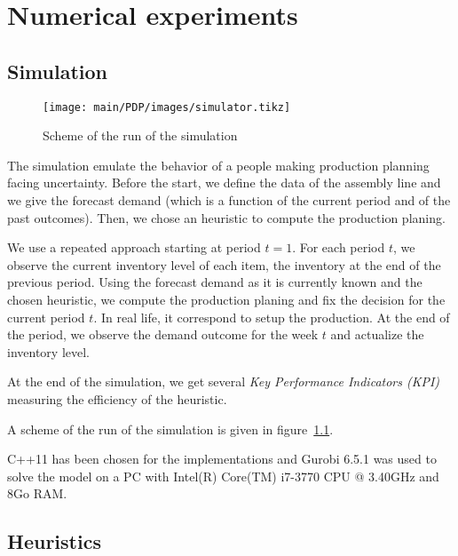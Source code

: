 \chapter{Numerical experiments}
\label{chap:PDP:numerical-experiments}


\section{Simulation}


\begin{figure}[h]
  \centering
  \texttt{[image: main/PDP/images/simulator.tikz]}
  \caption{Scheme of the run of the simulation}
  \label{fig:simulator}
\end{figure}

The simulation emulate the behavior of a people making production planning facing uncertainty. Before the start, we define the data of the assembly line and we give the forecast demand (which is a function of the current period and of the past outcomes). Then, we chose an heuristic to compute the production planing.

We use a repeated approach starting at period $t=1$. For each period $t$, we observe the current inventory level of each item, \ie the inventory at the end of the previous period. Using the forecast demand as it is currently known and the chosen heuristic, we compute the production planing and fix the decision for the current period $t$. In real life, it correspond to setup the production. At the end of the period, we observe the demand outcome for the week $t$ and actualize the inventory level.

At the end of the simulation, we get several \emph{Key Performance Indicators (KPI)} measuring the efficiency of the heuristic.

A scheme of the run of the simulation is given in figure~\ref{fig:simulator}.



C++11 has been chosen for the implementations and Gurobi 6.5.1 was used to solve the model on a PC with Intel(R) Core(TM) i7-3770 CPU @ 3.40GHz and 8Go RAM.




\section{Heuristics}


